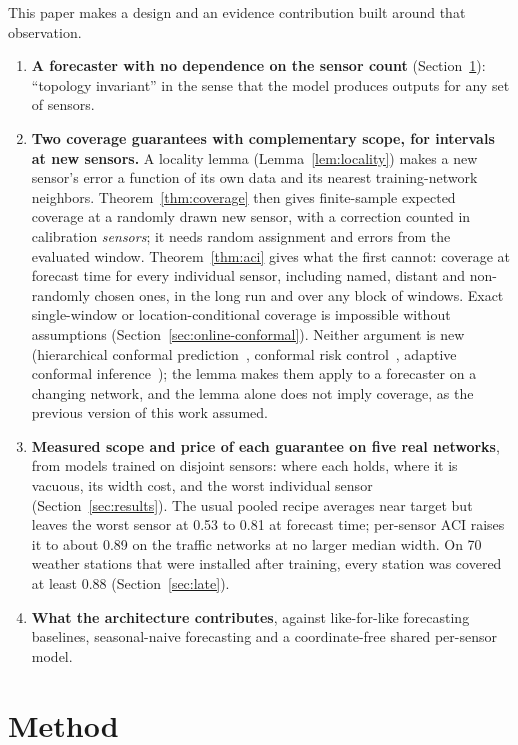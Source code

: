 \documentclass[journal,twoside,web]{ieeecolor}
\begin{document}
This paper makes a design and an evidence contribution built around that observation.
\begin{enumerate}
\item \textbf{A forecaster with no dependence on the sensor count}
(Section~\ref{sec:architecture}): ``topology invariant'' in the sense that the model produces outputs for any
set of sensors.
\item \textbf{Two coverage guarantees with complementary scope, for intervals at new sensors.} A locality lemma
(Lemma~\ref{lem:locality}) makes a new sensor's error a function of its own data and its nearest
training-network neighbors. Theorem~\ref{thm:coverage} then gives finite-sample expected coverage at a randomly
drawn new sensor, with a correction counted in calibration \emph{sensors}; it needs random assignment and errors
from the evaluated window. Theorem~\ref{thm:aci} gives what the first cannot: coverage at forecast time for every
individual sensor, including named, distant and non-randomly chosen ones, in the long run and over any block of
windows. Exact single-window or location-conditional coverage is impossible without assumptions
(Section~\ref{sec:online-conformal}). Neither argument is new (hierarchical conformal
prediction~\cite{lee2023hcp}, conformal risk control~\cite{crc2024}, adaptive conformal
inference~\cite{gibbs2021aci}); the lemma makes them apply to a forecaster on a changing network, and the lemma
alone does not imply coverage, as the previous version of this work assumed.
\item \textbf{Measured scope and price of each guarantee on five real networks}, from models trained on disjoint
sensors: where each holds, where it is vacuous, its width cost, and the worst individual sensor
(Section~\ref{sec:results}). The usual pooled recipe averages near target but leaves the worst sensor at 0.53 to
0.81 at forecast time; per-sensor ACI raises it to about 0.89 on the traffic networks at no larger median width. On 70 weather
stations that were installed after training, every station was covered at least 0.88 (Section~\ref{sec:late}).
\item \textbf{What the architecture contributes}, against like-for-like forecasting baselines, seasonal-naive
forecasting and a coordinate-free shared per-sensor model.
\end{enumerate}
\section{Method}
\label{sec:architecture}
\end{document}
